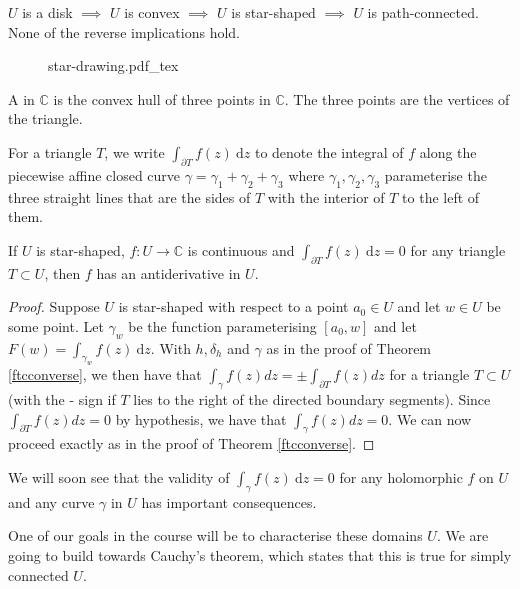 \documentclass[a4paper]{scrartcl}
\newcommand{\incfig}[2]{%
    \def\svgwidth{#1mm}
    {#2.pdf_tex}
}
\begin{document}
\begin{remark}
      $U$ is a disk $\implies $ $U$ is convex $\implies $ $U$ is star-shaped $\implies $ $U$ is path-connected. None of the reverse implications hold.
      \begin{figure}[H]
           \centering
           \incfig{85}{star-drawing}
      \end{figure}
      
\end{remark}
\begin{definition*}[Triangle]
      A  in $\mathbb{C}$ is the convex hull of three points in $\mathbb{C}$. The three points are the vertices of the triangle.
\end{definition*}
\begin{notation}
     For a triangle $T$, we write $\int_{\partial T}^{}f (z) \ \mathrm{d}z $ to denote the integral of $f$ along the piecewise affine closed curve $\gamma=\gamma_1 +\gamma_2 +\gamma_3 $ where $\gamma_1 , \gamma_2 , \gamma_3 $ parameterise the three straight lines that are the sides of $T$ with the interior of $T$ to the left of them.
\end{notation}
\begin{corollary}\label{starantideriv}
      If $U$ is star-shaped, $f: U \rightarrow \mathbb{C}$ is continuous and $\int_{\partial T}^{}f (z) \ \mathrm{d}z =0$ for any triangle $T \subset U$, then $f$ has an antiderivative in $U$.
\end{corollary}
\begin{proof}
      Suppose $U$ is star-shaped with respect to a point $a_0 \in U$ and let $w \in U$ be some point. Let $\gamma_{w}$ be the function parameterising $[a_0 ,w]$ and let $F (w)=\int_{\gamma_{w}}^{}f (z) \ \mathrm{d}z .$ With $h, \delta_{h}$ and $\gamma$ as in the proof of Theorem \ref{ftcconverse}, we then have that $\int_{\gamma} f(z) d z=\pm \int_{\partial T} f(z) d z$ for a triangle $T \subset U$ (with the - sign if $T$ lies to the right of the directed boundary segments).
      Since $\int_{\partial T} f(z) d z=0$ by hypothesis, we have that $\int_{\gamma} f(z) d z=0$. We can now proceed exactly as in the proof of Theorem \ref{ftcconverse}.
\end{proof}
We will soon see that the validity of $\int_{\gamma}^{}f (z) \ \mathrm{d}z=0 $ for any holomorphic $f$ on $U$ and any curve $\gamma$ in $U$ has important consequences.

One of our goals in the course will be to characterise these domains $U$. We are going to build towards Cauchy's theorem, which states that this is true for simply connected $U$.
\end{document}
